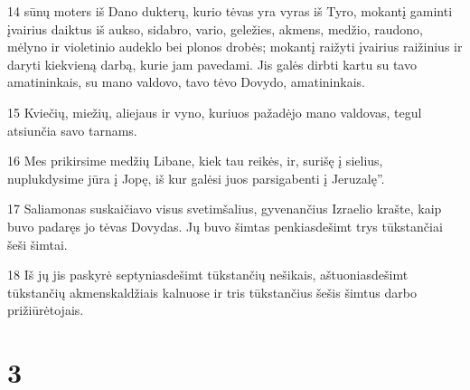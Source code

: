 \par 14 sūnų moters iš Dano dukterų, kurio tėvas yra vyras iš Tyro, mokantį gaminti įvairius daiktus iš aukso, sidabro, vario, geležies, akmens, medžio, raudono, mėlyno ir violetinio audeklo bei plonos drobės; mokantį raižyti įvairius raižinius ir daryti kiekvieną darbą, kurie jam pavedami. Jis galės dirbti kartu su tavo amatininkais, su mano valdovo, tavo tėvo Dovydo, amatininkais. 
\par 15 Kviečių, miežių, aliejaus ir vyno, kuriuos pažadėjo mano valdovas, tegul atsiunčia savo tarnams. 
\par 16 Mes prikirsime medžių Libane, kiek tau reikės, ir, surišę į sielius, nuplukdysime jūra į Jopę, iš kur galėsi juos parsigabenti į Jeruzalę”. 
\par 17 Saliamonas suskaičiavo visus svetimšalius, gyvenančius Izraelio krašte, kaip buvo padaręs jo tėvas Dovydas. Jų buvo šimtas penkiasdešimt trys tūkstančiai šeši šimtai. 
\par 18 Iš jų jis paskyrė septyniasdešimt tūkstančių nešikais, aštuoniasdešimt tūkstančių akmenskaldžiais kalnuose ir tris tūkstančius šešis šimtus darbo prižiūrėtojais.



\chapter{3}

